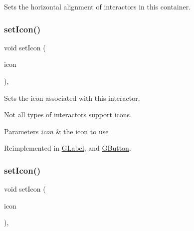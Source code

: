 Sets the horizontal alignment of interactors in this container. 

\mbox{\label{classGInteractor_a542abfcd7261751352af129c7215ecda}} 
\subsubsection{\texorpdfstring{set\+Icon()}{setIcon()}\hspace{0.1cm}{\footnotesize\ttfamily [1/3]}}
{\footnotesize\ttfamily void set\+Icon (\begin{DoxyParamCaption}\item[{const Q\+Icon \&}]{icon }\end{DoxyParamCaption})\hspace{0.3cm}{\ttfamily [virtual]}, {\ttfamily [inherited]}}



Sets the icon associated with this interactor. 

Not all types of interactors support icons. 
\begin{DoxyParams}{Parameters}
{\em icon} & the icon to use \\
\hline
\end{DoxyParams}


Reimplemented in \mbox{\hyperlink{classGLabel_acca97b6c6330abded1c80521c9aca3a6}{G\+Label}}, and \mbox{\hyperlink{classGButton_acca97b6c6330abded1c80521c9aca3a6}{G\+Button}}.

\mbox{\label{classGInteractor_a368e1a338f84401c284506d03b1ba769}} 
\subsubsection{\texorpdfstring{set\+Icon()}{setIcon()}\hspace{0.1cm}{\footnotesize\ttfamily [2/3]}}
{\footnotesize\ttfamily void set\+Icon (\begin{DoxyParamCaption}\item[{const Q\+Pixmap \&}]{icon }\end{DoxyParamCaption})\hspace{0.3cm}{\ttfamily [virtual]}, {\ttfamily [inherited]}}



